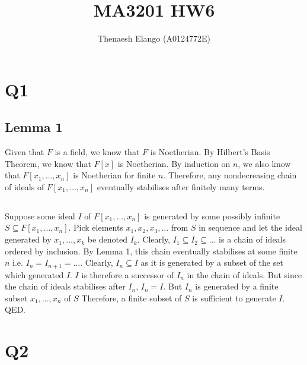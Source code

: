 \documentclass[]{article}
\title{MA3201 HW6}
\author{Thenaesh Elango (A0124772E)}
\begin{document}
\maketitle

\section*{Q1}
\subsection*{Lemma 1}
Given that $F$ is a field, we know that $F$ is Noetherian.\newline
By Hilbert's Basis Theorem, we know that $F[x]$ is Noetherian.\newline
By induction on $n$, we also know that $F[x_1, \dots, x_n]$ is Noetherian for finite $n$.\newline
Therefore, any nondecreasing chain of ideals of $F[x_1, \dots, x_n]$ eventually stabilises after finitely many terms.

\subsection*{}
Suppose some ideal $I$ of $F[x_1, \dots, x_n]$ is generated by some possibly infinite $S \subseteq F[x_1, \dots, x_n]$.\newline
Pick elements $x_1, x_2, x_3, \dots$ from $S$ in sequence and let the ideal generated by $x_1, \dots, x_k$ be denoted $I_k$.\newline
Clearly, $I_1 \subseteq I_2 \subseteq \dots$ is a chain of ideals ordered by inclusion.\newline
By Lemma 1, this chain eventually stabilises at some finite $n$ i.e. $I_n = I_{n+1} = \dots$.\newline
Clearly, $I_n \subseteq I$ as it is generated by a subset of the set which generated $I$.\newline
$I$ is therefore a successor of $I_n$ in the chain of ideals.\newline
But since the chain of ideals stabilises after $I_n$, $I_n = I$.\newline
But $I_n$ is generated by a finite subset $x_1,\dots, x_n$ of $S$\newline
Therefore, a finite subset of $S$ is sufficient to generate $I$. QED.


\section*{Q2}
\end{document}
